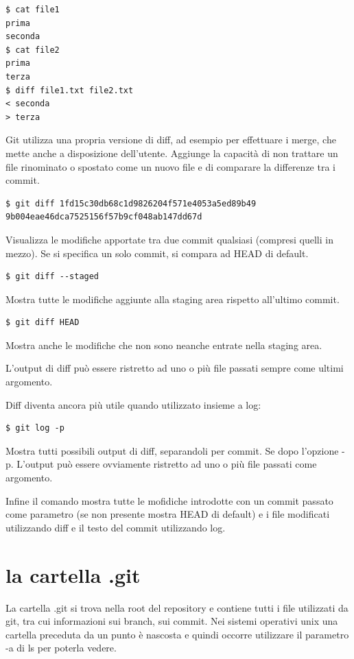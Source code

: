 \documentclass{article}
\begin{document}
\begin{verbatim}
$ cat file1
prima
seconda
$ cat file2
prima
terza
$ diff file1.txt file2.txt
< seconda
> terza
\end{verbatim}

Git utilizza una propria versione di diff, ad esempio per effettuare i merge,
che mette anche a disposizione dell'utente. Aggiunge la capacità di non trattare
un file rinominato o spostato come un nuovo file e di comparare la differenze
tra i commit.

\begin{verbatim}
$ git diff 1fd15c30db68c1d9826204f571e4053a5ed89b49 9b004eae46dca7525156f57b9cf048ab147dd67d
\end{verbatim}

Visualizza le modifiche apportate tra due commit qualsiasi (compresi
quelli in mezzo).
Se si specifica un solo commit, si compara ad HEAD di default.

\begin{verbatim}
$ git diff --staged
\end{verbatim}

Mostra tutte le modifiche aggiunte alla staging area rispetto all'ultimo commit.

\begin{verbatim}
$ git diff HEAD
\end{verbatim}

Mostra anche le modifiche che non sono neanche entrate nella staging area.

L'output di diff può essere ristretto ad uno o più file passati sempre come
ultimi argomento.

Diff diventa ancora più utile quando utilizzato insieme a log:

\begin{verbatim}
$ git log -p
\end{verbatim}

Mostra tutti possibili output di diff, separandoli per commit. Se dopo l'opzione
-p. L'output può essere ovviamente ristretto ad uno o più file passati come
argomento.

Infine il comando  mostra tutte le mofidiche introdotte con un
commit passato come parametro (se non presente mostra HEAD di default) e i file
modificati utilizzando diff e il testo del commit utilizzando log.

\section{la cartella .git}
La cartella .git si trova nella root del repository e contiene tutti i file
utilizzati da git, tra cui informazioni sui branch, sui commit. Nei sistemi
operativi unix una cartella preceduta da un punto è nascosta e quindi occorre
utilizzare il parametro -a di ls per poterla vedere.
\end{document}
